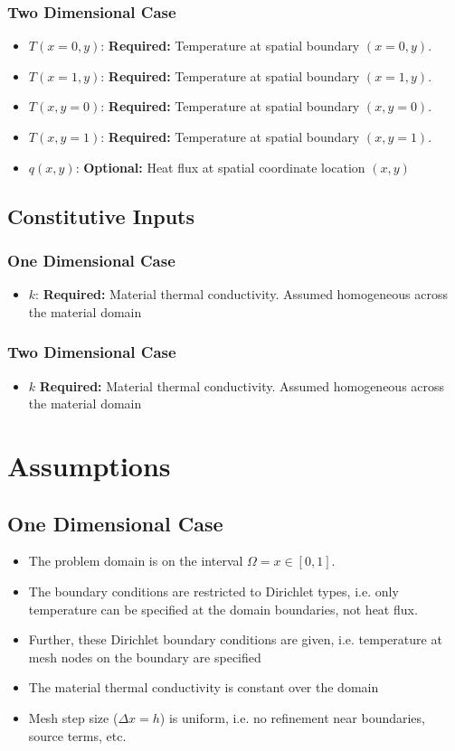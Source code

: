 \documentclass[letterpaper,12pt]{article}
\begin{document}
\subsubsection{Two Dimensional Case}
\begin{itemize}
\item $T(x=0, y)$: \textbf{Required:} Temperature at spatial boundary $(x=0, y)$.
\item $T(x=1, y)$: \textbf{Required:} Temperature at spatial boundary $(x=1, y)$. 
\item $T(x, y=0)$: \textbf{Required:} Temperature at spatial boundary $(x, y=0)$.
\item $T(x, y=1)$: \textbf{Required:} Temperature at spatial boundary $(x, y=1)$.  
\item $q(x, y)$: \textbf{Optional:} Heat flux at spatial coordinate location $(x, y)$
\end{itemize}
\subsection{Constitutive Inputs}
\subsubsection{One Dimensional Case}
\begin{itemize}
\item $k$: \textbf{Required:} Material thermal conductivity. Assumed homogeneous across the material domain
\end{itemize}
\subsubsection{Two Dimensional Case}
\begin{itemize}
\item $k$ \textbf{Required:} Material thermal conductivity. Assumed homogeneous across the material domain
\end{itemize}

\section{Assumptions}
\subsection{One Dimensional Case}
\begin{itemize}
\item The problem domain is on the interval $\Omega =  x \in [0, 1]$.
\item The boundary conditions are restricted to Dirichlet types, i.e. only temperature can be specified at the domain boundaries, not heat flux.
\item Further, these Dirichlet boundary conditions are given, i.e. temperature at mesh nodes on the boundary are specified
\item The material thermal conductivity is constant over the domain
\item Mesh step size ($\Delta x = h$) is uniform, i.e. no refinement near boundaries, source terms, etc.
\end{itemize}
\end{document}
